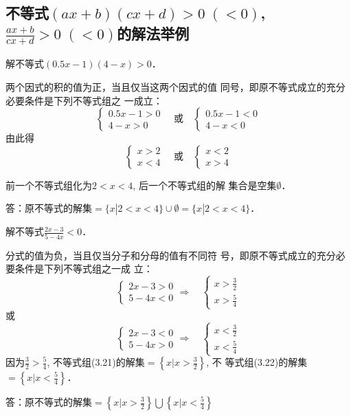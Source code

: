 \subsection{不等式$(ax+b)(cx+d)>0\; (<0)$,
$\frac{ax+b}{cx+d}>0\; (<0)$的解法举例}
\begin{example}
    解不等式$(0.5x-1)(4-x)>0$．
\end{example}

\begin{solution}
两个因式的积的值为正，当且仅当这两个因式的值
同号，即原不等式成立的充分必要条件是下列不等式组之
一成立：
\[\begin{cases}
    0.5x-1>0\\4-x>0
\end{cases}\quad \text{或}\quad \begin{cases}
    0.5x-1<0\\4-x<0
\end{cases}\]
由此得
\[\begin{cases}
    x>2\\x<4
\end{cases}\quad \text{或}\quad \begin{cases}
    x<2\\x>4
\end{cases}\]

前一个不等式组化为$2<x<4$, 后一个不等式组的解
集合是空集$\emptyset$．

答：原不等式的解集$=\{x|2<x<4\}\cup\emptyset=\{x|2<x<4\}$．
\end{solution}

\begin{example}
    解不等式$\frac{2x-3}{5-4x}<0$．
\end{example}

\begin{solution}
分式的值为负，当且仅当分子和分母的值有不同符
号，即原不等式成立的充分必要条件是下列不等式组之一成
立：
\begin{equation}
    \begin{cases}
        2x-3>0\\5-4x<0
    \end{cases}\Rightarrow\quad \begin{cases}
        x>\frac{3}{2}\\  x>\frac{5}{4}
    \end{cases}
\end{equation}
或
\begin{equation}
    \begin{cases}
        2x-3<0\\5-4x>0
    \end{cases}\Rightarrow\quad \begin{cases}
        x<\frac{3}{2}\\  x<\frac{5}{4}
    \end{cases}
\end{equation}
因为$\frac{3}{2}>\frac{5}{4}$,
不等式组(3.21)的解集$=\left\{x\Big|x>\frac{3}{2}\right\}$, 不
等式组(3.22)的解集$=\left\{x\Big|x<\frac{5}{4}\right\}$．

答：原不等式的解集$=\left\{x\Big|x>\frac{3}{2}\right\}\bigcup\left\{x\Big|x<\frac{5}{4}\right\}$
\end{solution}

